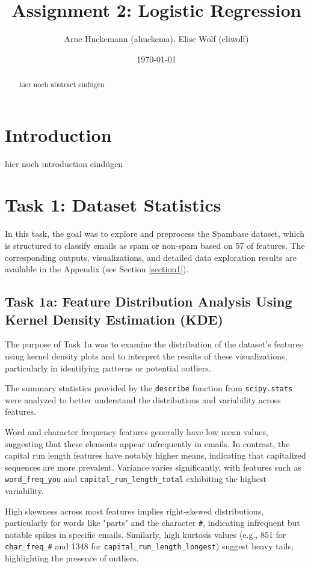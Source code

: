 \documentclass[a4paper,oneside,bibliography=totoc]{scrartcl}
\begin{document}
\subject{Report - Machine Learning (HWS 2024)} %
\title{Assignment 2: Logistic Regression}
\author{Arne Huckemann (ahuckema), Elise Wolf (eliwolf)}
\date{\today}
\maketitle


\begin{abstract}
hier noch abstract einfügen
\end{abstract}


\section{Introduction}
\label{ch:intro}
hier noch introduction eindügen


\section{Task 1: Dataset Statistics}
In this task, the goal was to explore and preprocess the Spambase dataset, which is structured to classify emails as spam or non-spam based on 57 of features. The corresponding outputs, visualizations, and detailed data exploration results are available in the Appendix (see Section \ref{section1}).

\subsection{Task 1a: Feature Distribution Analysis Using Kernel Density Estimation (KDE)}
The purpose of Task 1a was to examine the distribution of the dataset’s features using kernel density plots and to interpret the results of these visualizations, particularly in identifying patterns or potential outliers.

The summary statistics provided by the \texttt{describe} function from \texttt{scipy.stats} were analyzed to better understand the distributions and variability across features. 

Word and character frequency features generally have low mean values, suggesting that these elements appear infrequently in emails. In contrast, the capital run length features have notably higher means, indicating that capitalized sequences are more prevalent. Variance varies significantly, with features such as \texttt{word\_freq\_you} and \texttt{capital\_run\_length\_total} exhibiting the highest variability.

High skewness across most features implies right-skewed distributions, particularly for words like "parts" and the character \texttt{\#}, indicating infrequent but notable spikes in specific emails. Similarly, high kurtosis values (e.g., 851 for \texttt{char\_freq\_\#} and 1348 for \texttt{capital\_run\_length\_longest}) suggest heavy tails, highlighting the presence of outliers.
\end{document}
